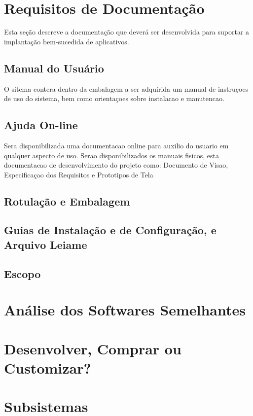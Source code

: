 \section{Requisitos de Documentação}
Esta seção descreve a documentação que deverá ser desenvolvida para suportar a implantação bem-sucedida de aplicativos.

\subsection{Manual do Usuário}
O sitema contera dentro da embalagem a ser adquirida um manual de instruçoes de uso do sistema, bem como orientaçoes sobre instalacao e manutencao.

\subsection{Ajuda On-line}
Sera disponibilizada uma documentacao online para auxilio do usuario em qualquer aspecto de uso. Serao disponibilizados os manuais fisicos, esta documentacao de desenvolvimento do projeto como: Documento de Visao, Especificaçao dos Requisitos e Prototipos de Tela

\subsection{Rotulação e Embalagem}

\subsection{Guias de Instalação e de Configuração, e Arquivo Leiame}

\subsection{Escopo}

\section{Análise dos Softwares Semelhantes}

\section{Desenvolver, Comprar ou Customizar?}

\section{Subsistemas}
  
